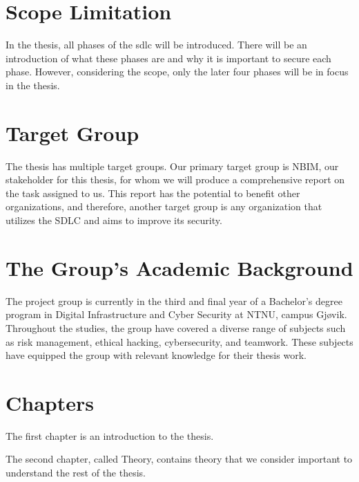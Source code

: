 \section{Scope Limitation}
In the thesis, all phases of the \acrlong{sdlc} will be introduced. There will be an introduction of what these phases are and why it is important to secure each phase. However, considering the scope, only the later four phases will be in focus in the thesis. 

\section{Target Group}
The thesis has multiple target groups. Our primary target group is NBIM, our stakeholder for this thesis, for whom we will produce a comprehensive report on the task assigned to us. This report has the potential to benefit other organizations, and therefore, another target group is any organization that utilizes the SDLC and aims to improve its security.

\section{The Group’s Academic Background}
The project group is currently in the third and final year of a Bachelor's degree program in Digital Infrastructure and Cyber Security at NTNU, campus Gjøvik. Throughout the studies, the group have covered a diverse range of subjects such as risk management, ethical hacking, cybersecurity, and teamwork. These subjects have equipped the group with relevant knowledge for their thesis work.
\section{Chapters}
The first chapter is an introduction to the thesis.

The second chapter, called Theory, contains theory that we consider important to understand the rest of the thesis.



